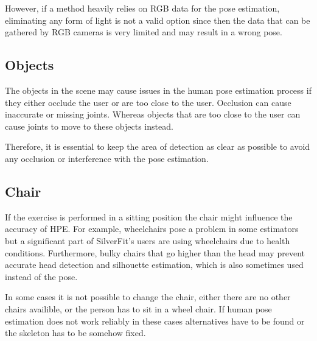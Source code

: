 However, if a method heavily relies on RGB data for the pose estimation, eliminating any form of light is not a valid option since then the data that can be gathered by RGB cameras is very limited and may result in a wrong pose.

\subsection{Objects}

The objects in the scene may cause issues in the human pose estimation process if they either occlude the user or are too close to the user. Occlusion can cause inaccurate or missing joints. Whereas objects that are too close to the user can cause joints to move to these objects instead.

Therefore, it is essential to keep the area of detection as clear as possible to avoid any occlusion or interference with the pose estimation.

\subsection{Chair}

If the exercise is performed in a sitting position the chair might influence the accuracy of HPE. For example, wheelchairs pose a problem in some estimators but a significant part of SilverFit's users are using wheelchairs due to health conditions. Furthermore, bulky chairs that go higher than the head may prevent accurate head detection and silhouette estimation, which is also sometimes used instead of the pose.

In some cases it is not possible to change the chair, either there are no other chairs availible, or the person has to sit in a wheel chair. If human pose estimation does not work reliably in these cases alternatives have to be found or the skeleton has to be somehow fixed.